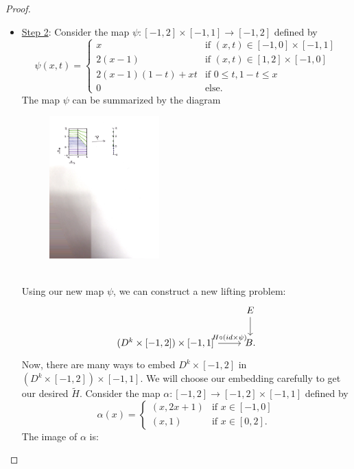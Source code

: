 \documentclass{article}
\newtheorem{proposed work}[theorem]{Proposed Work}
\theoremstyle{definition}
\begin{document}
\begin{proof}
\begin{itemize}
\item \underline{Step 2}: Consider the map $\psi: [-1,2] \times [-1,1] \to [-1,2]$ defined by
\begin{equation*}
\psi(x,t) = \begin{cases}
x & \text{if } (x,t) \in [-1,0] \times [-1,1] \\
2(x-1) & \text{if } (x,t) \in [1,2] \times [-1,0] \\
2(x-1)(1-t) + xt & \text{if } 0 \leq t, 1-t \leq x \\
0 & \text{else}.
\end{cases}
\end{equation*}
The map $\psi$ can be summarized by the diagram
\begin{figure}[h]
\centering
\includegraphics[width=0.4\textwidth]{psipic}
\end{figure}\\
Using our new map $\psi$, we can construct a new lifting problem:
\begin{equation*}
\begin{tikzcd}
& E \arrow[d] \\
(D^k \times [-1,2]) \times [-1,1] \arrow[r,"H \circ (id \times \psi)"] & B.
\end{tikzcd}
\end{equation*}
Now, there are many ways to embed $D^k \times [-1,2]$ in $(D^k \times [-1,2]) \times [-1,1]$. We will choose our embedding carefully to get our desired $\widetilde{H}$. Consider the map $\alpha: [-1,2] \to [-1,2] \times [-1,1]$ defined by 
\begin{equation*}
\alpha(x) = \begin{cases}
(x, 2x+1) & \text{if } x \in [-1,0] \\
(x,1) & \text{if } x \in [0,2].
\end{cases}
\end{equation*}
The image of $\alpha$ is:

\end{itemize}
\end{proof}
\end{document}
